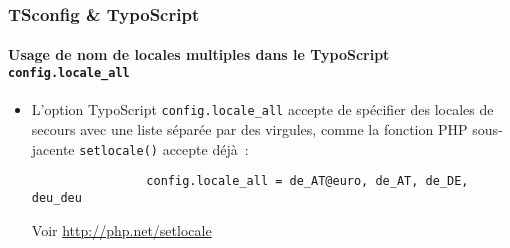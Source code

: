 \begin{frame}[fragile]
	\frametitle{TSconfig \& TypoScript}
	\framesubtitle{Usage de nom de locales multiples dans le TypoScript \texttt{config.locale\_all}}

	\lstset{basicstyle=\small\ttfamily}

	\begin{itemize}

		\item L'option TypoScript \texttt{config.locale\_all} accepte de spécifier
			des locales de secours avec une liste séparée par des virgules, comme
			la fonction PHP sous-jacente \texttt{setlocale()} accepte déjà~:

			\begin{lstlisting}
				config.locale_all = de_AT@euro, de_AT, de_DE, deu_deu
			\end{lstlisting}

			Voir \url{http://php.net/setlocale}

	\end{itemize}

\end{frame}

